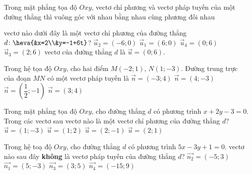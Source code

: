 \begin{ex}%
	Trong mặt phẳng tọa độ $Oxy$, vectơ chỉ phương và vectơ pháp tuyến của một đường thẳng thì
	\choice
	{\True vuông góc với nhau}
	{bằng nhau}
	{cùng phương}
	{đối nhau}
\end{ex}


\begin{ex}%
	vectơ nào dưới đây là một vectơ chỉ phương của đường thẳng $d\colon\heva{&x=2\\&y=-1+6t}$?
	\choice
	{$\overrightarrow{u}_2=(-6;0)$}
	{$\overrightarrow{u}_1=(6;0)$}
	{\True $\overrightarrow{u}_4=(0;6)$}
	{$\overrightarrow{u}_3=(2;6)$}
	\loigiai
	{
		vectơ của đường thẳng $d$ là $\overrightarrow{u}=(0;6)$.
	}
\end{ex}


\begin{ex}%
	Trong hệ tọa độ $Oxy$, cho hai điểm $M(-2;1)$, $N(1;-3)$. Đường trung trực của đoạn $MN$ có một vectơ pháp tuyến là
	\choice
	{\True $\overrightarrow{n}=(-3;4)$}
	{$\overrightarrow{n}=(4;-3)$}
	{$\overrightarrow{n}=\left(\dfrac{1}{2};-1\right)$}
	{$\overrightarrow{n}=(3;4)$}
\end{ex}


\begin{ex}%
	Trong mặt phẳng tọa độ $Oxy$, cho đường thẳng $d$ có phương trình $x+2y-3=0$. Trong các vectơ sau vectơ nào là một vectơ chỉ phương của đường thẳng $d$?
	\choice
	{$\overrightarrow{u}=(1;-3)$}
	{$\overrightarrow{u}=(1;2)$}
	{\True $\overrightarrow{u}=(2;-1)$}
	{$\overrightarrow{u}=(2;1)$}
\end{ex}


\begin{ex}%
	Trong hệ toạ độ $Oxy$, cho đường thẳng $d$ có phương trình $5x-3y+1=0$. vectơ nào sau đây \textbf{không} là vectơ pháp tuyến của đường thẳng $d$?
	\choice
	{$\overrightarrow{n_2}=(-5;3)$}
	{$\overrightarrow{n_1}=(5;-3)$}
	{\True $\overrightarrow{n_3}=(3;5)$}
	{$\overrightarrow{n_4}=(-15;9)$}
\end{ex}


